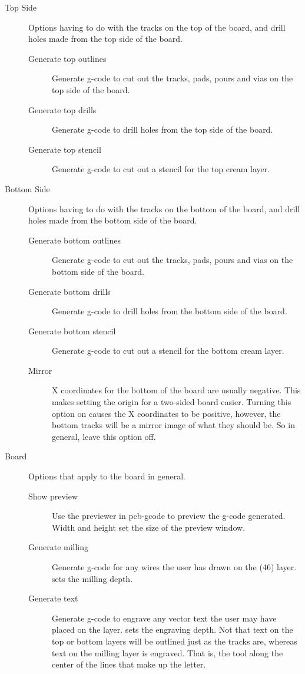 \documentclass[11pt]{book}
\begin{document}
\begin{description}
	\item[Top Side] Options having to do with the tracks on the top of the board, and drill holes made from the top side of the board.
	\begin{description}
		\item[Generate top outlines] Generate g-code to cut out the tracks, pads, pours and vias on the top side of the board.
		\item[Generate top drills] Generate g-code to drill holes from the top side of the board.
		\item[Generate top stencil] Generate g-code to cut out a stencil for the top cream layer.
	\end{description}
	\item[Bottom Side] Options having to do with the tracks on the bottom of the board, and drill holes made from the bottom side of the board.
	\begin{description}
		\item[Generate bottom outlines] Generate g-code to cut out the tracks, pads, pours and vias on the bottom side of the board.
		\item[Generate bottom drills] Generate g-code to drill holes from the bottom side of the board.
		\item[Generate bottom stencil] Generate g-code to cut out a stencil for the bottom cream layer.
		\item[Mirror] X coordinates for the bottom of the board are usually negative. This makes setting the origin for a two-sided board easier. Turning this option on causes the X coordinates to be positive, however, the bottom tracks will be a mirror image of what they should be. So in general, leave this option off.
	\end{description}
	\item[Board] Options that apply to the board in general.
	\begin{description}
		\item[Show preview] Use the previewer in pcb-gcode to preview the g-code generated.
		\subitem Width and height set the size of the preview window.
		\item[Generate milling] Generate g-code for any wires the user has drawn on the  (46) layer.  sets the milling depth.
		\item[Generate text] Generate g-code to engrave any vector text the user may have placed on the  layer.  sets the engraving depth. Not that text on the top or bottom layers will be outlined just as the tracks are, whereas text on the milling layer is engraved. That is, the tool along the center of the lines that make up the letter.

\end{description}
\end{description}
\end{document}
